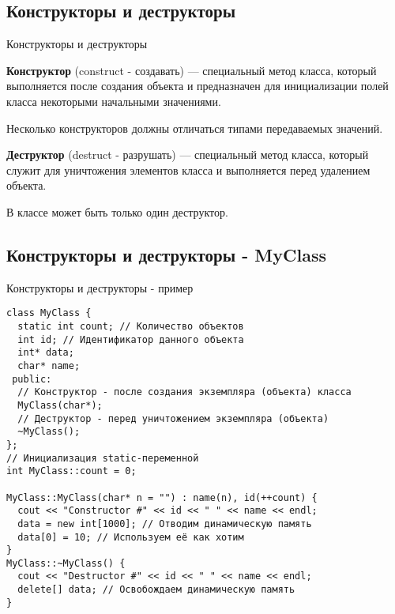  
\subsection{Конструкторы и деструкторы}

\begin{frame}[t,fragile]{Конструкторы и деструкторы}

\textbf{Конструктор} (construct - создавать) --- 
специальный метод класса, который выполняется после создания объекта и предназначен для инициализации 
полей класса некоторыми начальными значениями.

Несколько конструкторов должны отличаться типами передаваемых значений.

\textbf{Деструктор} (destruct - разрушать) --- 
специальный метод класса, который служит для уничтожения 
элементов класса и выполняется перед удалением объекта. 

В классе может быть только один деструктор.

\end{frame}

\subsection{Конструкторы и деструкторы - MyClass}

\begin{frame}[t,fragile]{Конструкторы и деструкторы - пример}
\begin{lstlisting}
class MyClass {
  static int count; // Количество объектов
  int id; // Идентификатор данного объекта
  int* data;
  char* name;
 public:
  // Конструктор - после создания экземпляра (объекта) класса
  MyClass(char*);
  // Деструктор - перед уничтожением экземпляра (объекта)
  ~MyClass();
};
// Инициализация static-переменной
int MyClass::count = 0;

MyClass::MyClass(char* n = "") : name(n), id(++count) {
  cout << "Constructor #" << id << " " << name << endl;
  data = new int[1000]; // Отводим динамическую память
  data[0] = 10; // Используем её как хотим
}
MyClass::~MyClass() {
  cout << "Destructor #" << id << " " << name << endl;
  delete[] data; // Освобождаем динамическую память
}
\end{lstlisting}
\end{frame}



